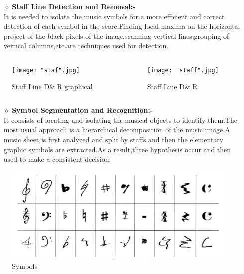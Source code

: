 \documentclass{beamer}
\begin{document}
\begin{frame}
\transboxout
\begin{itemize}
\item[$\diamond$]{\bf{Staff Line Detection and Removal}:-}\\ \pause
It is needed to isolate the music symbols for a more efficient and correct detection of each symbol in the score.Finding local maxima on the horizontal project of the black pixels of the image,scanning vertical lines,grouping of vertical columns,etc.are techniques used for detection.\pause
\end{itemize}

\begin{columns}
\begin{column}{0.5\textwidth}
\begin{figure}
    \texttt{[image: "staf".jpg]}
    \caption{Staff Line D\& R graphical}\pause
\end{figure}
\end{column}
\begin{column}{0.5\textwidth}
\begin{figure}
    \texttt{[image: "staff".jpg]}
    \caption{Staff Line D\& R }\pause
\end{figure}
\end{column}
\end{columns}
\end{frame}

\begin{frame}
\transboxout

\begin{itemize}
\item[$\diamond$]{\bf{Symbol Segmentation and Recognition}:-}\\ \pause
It consists of locating and isolating the musical objects to identify them.The most usual approach is a hierarchical decomposition of the music image.A music sheet is first analyzed and split by staffs and then the elementary graphic symbols are extracted.As a result,three hypothesis occur and then used to make a consistent decision.\pause
\end{itemize}
\begin{figure}
\includegraphics[width=.8\textwidth]{sym.png}
\caption{Symbols}\pause
\end{figure}
\end{frame}
\end{document}
